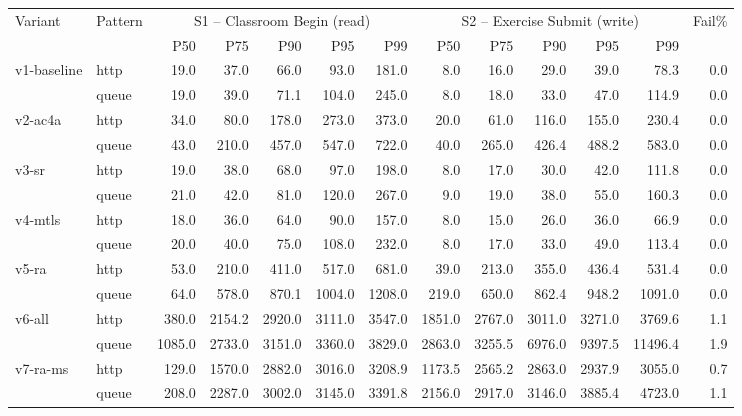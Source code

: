 \begin{tabular}{llrrrrrrrrrrr}
\toprule
Variant & Pattern & \multicolumn{5}{c}{S1 – Classroom Begin (read)} & \multicolumn{5}{c}{S2 – Exercise Submit (write)} & Fail\% \\
\cmidrule(lr){3-7}\cmidrule(lr){8-12}
 & & P50 & P75 & P90 & P95 & P99 & P50 & P75 & P90 & P95 & P99 & \\
\midrule
v1-baseline & http & 19.0 & 37.0 & 66.0 & 93.0 & 181.0 & 8.0 & 16.0 & 29.0 & 39.0 & 78.3 & 0.0 \\
 & queue & 19.0 & 39.0 & 71.1 & 104.0 & 245.0 & 8.0 & 18.0 & 33.0 & 47.0 & 114.9 & 0.0 \\
v2-ac4a & http & 34.0 & 80.0 & 178.0 & 273.0 & 373.0 & 20.0 & 61.0 & 116.0 & 155.0 & 230.4 & 0.0 \\
 & queue & 43.0 & 210.0 & 457.0 & 547.0 & 722.0 & 40.0 & 265.0 & 426.4 & 488.2 & 583.0 & 0.0 \\
v3-sr & http & 19.0 & 38.0 & 68.0 & 97.0 & 198.0 & 8.0 & 17.0 & 30.0 & 42.0 & 111.8 & 0.0 \\
 & queue & 21.0 & 42.0 & 81.0 & 120.0 & 267.0 & 9.0 & 19.0 & 38.0 & 55.0 & 160.3 & 0.0 \\
v4-mtls & http & 18.0 & 36.0 & 64.0 & 90.0 & 157.0 & 8.0 & 15.0 & 26.0 & 36.0 & 66.9 & 0.0 \\
 & queue & 20.0 & 40.0 & 75.0 & 108.0 & 232.0 & 8.0 & 17.0 & 33.0 & 49.0 & 113.4 & 0.0 \\
v5-ra & http & 53.0 & 210.0 & 411.0 & 517.0 & 681.0 & 39.0 & 213.0 & 355.0 & 436.4 & 531.4 & 0.0 \\
 & queue & 64.0 & 578.0 & 870.1 & 1004.0 & 1208.0 & 219.0 & 650.0 & 862.4 & 948.2 & 1091.0 & 0.0 \\
v6-all & http & 380.0 & 2154.2 & 2920.0 & 3111.0 & 3547.0 & 1851.0 & 2767.0 & 3011.0 & 3271.0 & 3769.6 & 1.1 \\
 & queue & 1085.0 & 2733.0 & 3151.0 & 3360.0 & 3829.0 & 2863.0 & 3255.5 & 6976.0 & 9397.5 & 11496.4 & 1.9 \\
v7-ra-ms & http & 129.0 & 1570.0 & 2882.0 & 3016.0 & 3208.9 & 1173.5 & 2565.2 & 2863.0 & 2937.9 & 3055.0 & 0.7 \\
 & queue & 208.0 & 2287.0 & 3002.0 & 3145.0 & 3391.8 & 2156.0 & 2917.0 & 3146.0 & 3885.4 & 4723.0 & 1.1 \\
\bottomrule
\end{tabular}